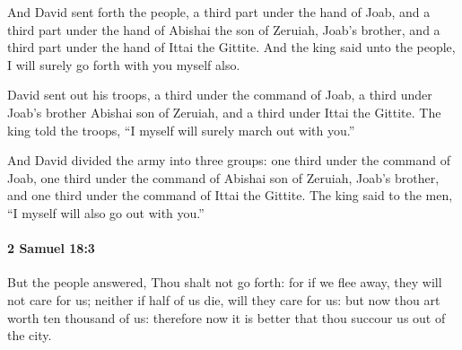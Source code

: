 			\begin{versebox}
					\item[BHS] 
					\item[ASV] And David sent forth the people, a third part under the hand of Joab, and a third part under the hand of Abishai the son of Zeruiah, Joab's brother, and a third part under the hand of Ittai the Gittite. And the king said unto the people, I will surely go forth with you myself also.
					\item[NIV] David sent out his troops, a third under the command of Joab, a third under Joab’s brother Abishai son of Zeruiah, and a third under Ittai the Gittite. The king told the troops, “I myself will surely march out with you.”
					\item[NRSV] And David divided the army into three groups: one third under the command of Joab, one third under the command of Abishai son of Zeruiah, Joab’s brother, and one third under the command of Ittai the Gittite. The king said to the men, “I myself will also go out with you.”
			\end{versebox}

		\paragraph{2 Samuel 18:3} %
			\label{2SAMUEL-18-3}

			But the people answered, Thou shalt not go forth: for if we flee away, they will not care for us; neither if half of us die, will they care for us: but now thou art worth ten thousand of us: therefore now it is better that thou succour us out of the city.

